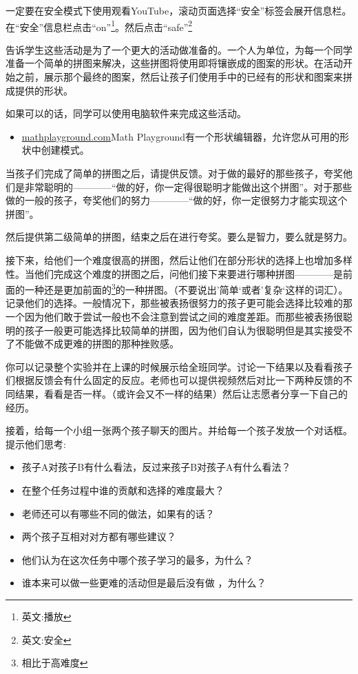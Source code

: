     \begin{note}
      一定要在安全模式下使用观看YouTube，滚动页面选择“安全”标签会展开信息栏。在“安全”信息栏点击“on”\footnote{英文:播放}。然后点击“safe”\footnote{英文:安全}  
    \end{note}  
    告诉学生这些活动是为了一个更大的活动做准备的。一个人为单位，为每一个同学准备一个简单的拼图来解决，这些拼图将使用即将镶嵌成的图案的形状。在活动开始之前，展示那个最终的图案，然后让孩子们使用手中的已经有的形状和图案来拼成提供的形状。\par
    如果可以的话，同学可以使用电脑软件来完成这些活动。\par
    \begin{itemize}
       \item \href{http://www.mathplayground.com/patternblocks.html}{mathplayground.com}Math Playground有一个形状编辑器，允许您从可用的形状中创建模式。
    \end{itemize}
    当孩子们完成了简单的拼图之后，请提供反馈。对于做的最好的那些孩子，夸奖他们是非常聪明的————“做的好，你一定得很聪明才能做出这个拼图”。对于那些做的一般的孩子，夸奖他们的努力————“做的好，你一定很努力才能实现这个拼图”。\par
    然后提供第二级简单的拼图，结束之后在进行夸奖。要么是智力，要么就是努力。\par
    接下来，给他们一个难度很高的拼图，然后让他们在部分形状的选择上也增加多样性。当他们完成这个难度的拼图之后，问他们接下来要进行哪种拼图————是前面的一种还是更加前面的\footnote{相比于高难度}的一种拼图。（不要说出’简单‘或者’复杂‘这样的词汇）。记录他们的选择。一般情况下，那些被表扬很努力的孩子更可能会选择比较难的那一个因为他们敢于尝试一般也不会注意到尝试之间的难度差距。而那些被表扬很聪明的孩子一般更可能选择比较简单的拼图，因为他们自认为很聪明但是其实接受不了不能做不成更难的拼图的那种挫败感。\par
    你可以记录整个实验并在上课的时候展示给全班同学。讨论一下结果以及看看孩子们根据反馈会有什么固定的反应。老师也可以提供视频然后对比一下两种反馈的不同结果，看看是否一样。（或许会又不一样的结果）然后让志愿者分享一下自己的经历。\par
    接着，给每一个小组一张两个孩子聊天的图片。并给每一个孩子发放一个对话框。提示他们思考:\par
    \begin{itemize}
      \item 孩子A对孩子B有什么看法，反过来孩子B对孩子A有什么看法？
      \item 在整个任务过程中谁的贡献和选择的难度最大？
      \item 老师还可以有哪些不同的做法，如果有的话？
      \item 两个孩子互相对对方都有哪些建议？
      \item 他们认为在这次任务中哪个孩子学习的最多，为什么？
      \item 谁本来可以做一些更难的活动但是最后没有做 ，为什么？
     \end{itemize} 
